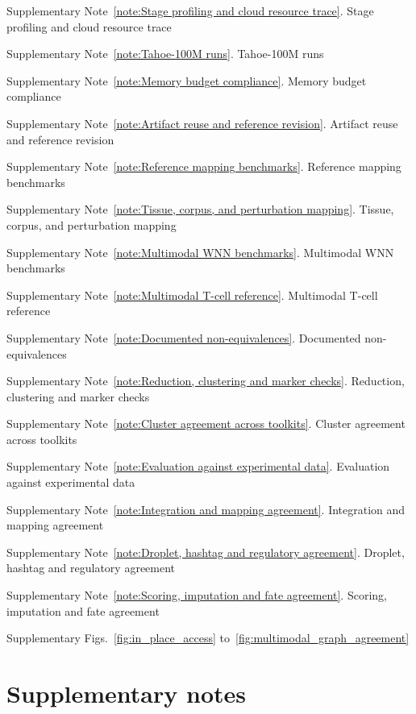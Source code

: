 \documentclass[11pt]{article}
\begin{document}
{{\begin{list}{\textbullet}{\setlength{\topsep}{2pt}\setlength{\itemsep}{0pt}\setlength{\parsep}{0pt}%
  \setlength{\leftmargin}{1.1em}\setlength{\labelwidth}{0.7em}\setlength{\labelsep}{0.4em}}
  \item Supplementary Note~\ref{note:Stage profiling and cloud resource trace}. Stage profiling and cloud resource trace
  \item Supplementary Note~\ref{note:Tahoe-100M runs}. Tahoe-100M runs
  \item Supplementary Note~\ref{note:Memory budget compliance}. Memory budget compliance
  \item Supplementary Note~\ref{note:Artifact reuse and reference revision}. Artifact reuse and reference revision
  \item Supplementary Note~\ref{note:Reference mapping benchmarks}. Reference mapping benchmarks
  \item Supplementary Note~\ref{note:Tissue, corpus, and perturbation mapping}. Tissue, corpus, and perturbation mapping
  \item Supplementary Note~\ref{note:Multimodal WNN benchmarks}. Multimodal WNN benchmarks
  \item Supplementary Note~\ref{note:Multimodal T-cell reference}. Multimodal T-cell reference
  \item Supplementary Note~\ref{note:Documented non-equivalences}. Documented non-equivalences
  \item Supplementary Note~\ref{note:Reduction, clustering and marker checks}. Reduction, clustering and marker checks
  \item Supplementary Note~\ref{note:Cluster agreement across toolkits}. Cluster agreement across toolkits
  \item Supplementary Note~\ref{note:Evaluation against experimental data}. Evaluation against experimental data
  \item Supplementary Note~\ref{note:Integration and mapping agreement}. Integration and mapping agreement
  \item Supplementary Note~\ref{note:Droplet, hashtag and regulatory agreement}. Droplet, hashtag and regulatory agreement
  \item Supplementary Note~\ref{note:Scoring, imputation and fate agreement}. Scoring, imputation and fate agreement
  \item Supplementary Figs.~\ref{fig:in_place_access} to~\ref{fig:multimodal_graph_agreement}
\end{list}}}

\manuscriptlinenumbers
\section*{Supplementary notes}




\clearpage


\end{document}
